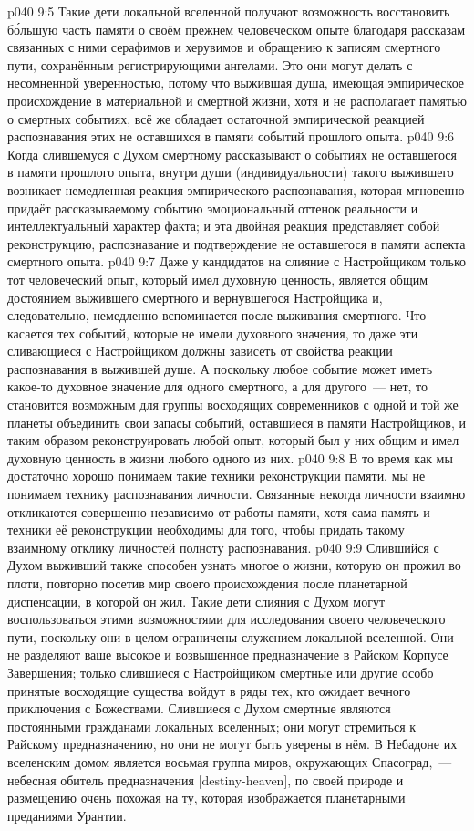 \vs p040 9:5 Такие дети локальной вселенной получают возможность восстановить б\'ольшую часть памяти о своём прежнем человеческом опыте благодаря рассказам связанных с ними серафимов и херувимов и обращению к записям смертного пути, сохранённым регистрирующими ангелами. Это они могут делать с несомненной уверенностью, потому что выжившая душа, имеющая эмпирическое происхождение в материальной и смертной жизни, хотя и не располагает памятью о смертных событиях, всё же обладает остаточной эмпирической реакцией распознавания этих не оставшихся в памяти событий прошлого опыта.
\vs p040 9:6 Когда слившемуся с Духом смертному рассказывают о событиях не оставшегося в памяти прошлого опыта, внутри души (индивидуальности) такого выжившего возникает немедленная реакция эмпирического распознавания, которая мгновенно придаёт рассказываемому событию эмоциональный оттенок реальности и интеллектуальный характер факта; и эта двойная реакция представляет собой реконструкцию, распознавание и подтверждение не оставшегося в памяти аспекта смертного опыта.
\vs p040 9:7 Даже у кандидатов на слияние с Настройщиком только тот человеческий опыт, который имел духовную ценность, является общим достоянием выжившего смертного и вернувшегося Настройщика и, следовательно, немедленно вспоминается после выживания смертного. Что касается тех событий, которые не имели духовного значения, то даже эти сливающиеся с Настройщиком должны зависеть от свойства реакции распознавания в выжившей душе. А поскольку любое событие может иметь какое\hyp{}то духовное значение для одного смертного, а для другого~--- нет, то становится возможным для группы восходящих современников с одной и той же планеты объединить свои запасы событий, оставшиеся в памяти Настройщиков, и таким образом реконструировать любой опыт, который был у них общим и имел духовную ценность в жизни любого одного из них.
\vs p040 9:8 \pc В то время как мы достаточно хорошо понимаем такие техники реконструкции памяти, мы не понимаем технику распознавания личности. Связанные некогда личности взаимно откликаются совершенно независимо от работы памяти, хотя сама память и техники её реконструкции необходимы для того, чтобы придать такому взаимному отклику личностей полноту распознавания.
\vs p040 9:9 \pc Слившийся с Духом выживший также способен узнать многое о жизни, которую он прожил во плоти, повторно посетив мир своего происхождения после планетарной диспенсации, в которой он жил. Такие дети слияния с Духом могут воспользоваться этими возможностями для исследования своего человеческого пути, поскольку они в целом ограничены служением локальной вселенной. Они не разделяют ваше высокое и возвышенное предназначение в Райском Корпусе Завершения; только слившиеся с Настройщиком смертные или другие особо принятые восходящие существа войдут в ряды тех, кто ожидает вечного приключения с Божествами. Слившиеся с Духом смертные являются постоянными гражданами локальных вселенных; они могут стремиться к Райскому предназначению, но они не могут быть уверены в нём. В Небадоне их вселенским домом является восьмая группа миров, окружающих Спасоград,~--- небесная обитель предназначения [destiny\hyp{}heaven], по своей природе и размещению очень похожая на ту, которая изображается планетарными преданиями Урантии.
